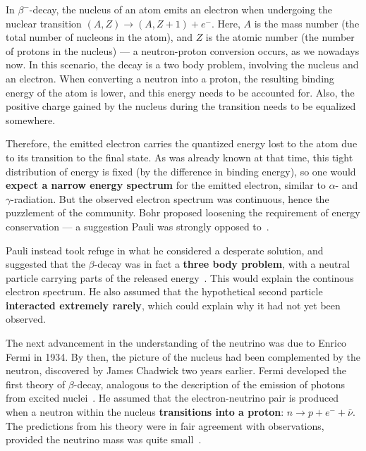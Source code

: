 In $\beta^-$-decay, the nucleus of an atom emits an electron when undergoing the nuclear transition $(A,Z)\rightarrow(A,Z+1) + e^-$. Here, $A$ is the mass number (the total number of nucleons in the atom), and $Z$ is the atomic number (the number of protons in the nucleus) --- a neutron-proton conversion occurs, as we nowadays now. In this scenario, the decay is a two body problem, involving the nucleus and an electron. When converting a neutron into a proton, the resulting binding energy of the atom is lower, and this energy needs to be accounted for. Also, the positive charge gained by the nucleus during the transition needs to be equalized somewhere.

Therefore, the emitted electron carries the quantized energy lost to the atom due to its transition to the final state. As was already known at that time, this tight distribution of energy is fixed (by the difference in binding energy), so one would \textbf{expect a narrow energy spectrum} for the emitted electron, similar to $\alpha$- and $\gamma$-radiation. But the observed electron spectrum was continuous, hence the puzzlement of the community. Bohr proposed loosening the requirement of energy conservation --- a suggestion Pauli was strongly opposed to~.

Pauli instead took refuge in what he considered a desperate solution, and suggested that the $\beta$-decay was in fact a \textbf{three body problem}, with a neutral particle carrying parts of the released energy~. This would explain the continous electron spectrum. He also assumed that the hypothetical second particle \textbf{interacted extremely rarely}, which could explain why it had not yet been observed.

The next advancement in the understanding of the neutrino was due to Enrico Fermi in 1934. By then, the picture of the nucleus had been complemented by the neutron, discovered by James Chadwick two years earlier. Fermi developed the first theory of $\beta$-decay, analogous to the description of the emission of photons from excited nuclei~\cite{Fermi1934}. He assumed that the electron-neutrino pair is produced when a neutron within the nucleus \textbf{transitions into a proton}: $n \rightarrow p + e^- + \bar{\nu}$. The predictions from his theory were in fair agreement with observations, provided the neutrino mass was quite small~\cite{Fermi1934}.

